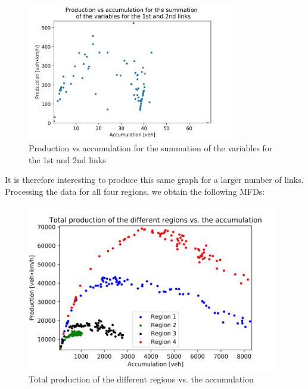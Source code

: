 \documentclass[a4paper, 12pt,oneside]{article}
\begin{document}
\begin{figure}[H]
    \begin{center}
        \includegraphics[width=9cm]{Images/Production vs accumulation for the summation of the variables for the 1st and 2nd links.png}
        \caption{Production vs accumulation for the summation of the variables for the 1st and 2nd links}
        \label{Production vs accumulation for the summation of the variables for the 1st and 2nd links}
    \end{center}
\end{figure}


It is therefore interesting to produce this same graph for a larger number of links. 
Processing the data for all four regions, we obtain the following MFDs:
\begin{figure}[H]
    \begin{center}
        \includegraphics[width=11cm]{Images/Total production of the different regions vs. the accumulation.png}
        \caption{Total production of the different regions vs. the accumulation}
        \label{Total production of the different regions vs. the accumulation}
    \end{center}
\end{figure}
\end{document}
